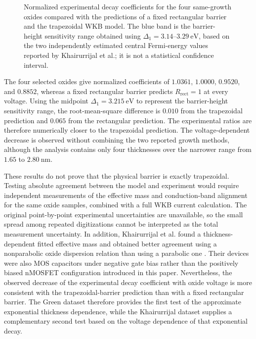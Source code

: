 \documentclass[12pt]{article}
\begin{document}
\begin{figure}[H]
\begin{singlespace}
        \caption{Normalized experimental decay coefficients for the four same-growth oxides compared with the predictions of a fixed rectangular barrier and the trapezoidal WKB model. The blue band is the barrier-height sensitivity range obtained using \(\Delta_1=3.14\)--\(3.29~\mathrm{eV}\), based on the two independently estimated central Fermi-energy values reported by Khairurrijal et al.; it is not a statistical confidence interval.}
        \label{fig:normalized-decay-coefficient}
    \end{singlespace}
\end{figure}

The four selected oxides give normalized coefficients of \(1.0361\), \(1.0000\), \(0.9520\), and \(0.8852\), whereas a fixed rectangular barrier predicts \(R_{\mathrm{rect}}=1\) at every voltage. Using the midpoint \(\Delta_1=3.215~\mathrm{eV}\) to represent the barrier-height sensitivity range, the root-mean-square difference is \(0.010\) from the trapezoidal prediction and \(0.065\) from the rectangular prediction. The experimental ratios are therefore numerically closer to the trapezoidal prediction. The voltage-dependent decrease is observed without combining the two reported growth methods, although the analysis contains only four thicknesses over the narrower range from \(1.65\) to \(2.80~\mathrm{nm}\).

These results do not prove that the physical barrier is exactly trapezoidal. Testing absolute agreement between the model and experiment would require independent measurements of the effective mass and conduction-band alignment for the same oxide samples, combined with a full WKB current calculation. The original point-by-point experimental uncertainties are unavailable, so the small spread among repeated digitizations cannot be interpreted as the total measurement uncertainty. In addition, Khairurrijal et al. found a thickness-dependent fitted effective mass and obtained better agreement using a nonparabolic oxide dispersion relation than using a parabolic one \cite{khairurrijal2000}. Their devices were also MOS capacitors under negative gate bias rather than the positively biased nMOSFET configuration introduced in this paper. Nevertheless, the observed decrease of the experimental decay coefficient with oxide voltage is more consistent with the trapezoidal-barrier prediction than with a fixed rectangular barrier. The Green dataset therefore provides the first test of the approximate exponential thickness dependence, while the Khairurrijal dataset supplies a complementary second test based on the voltage dependence of that exponential decay.
\end{document}
